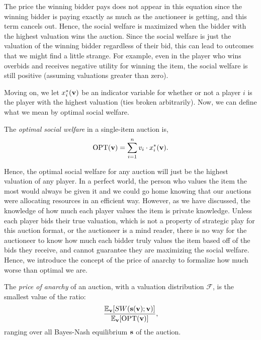 \documentclass[12pt,twoside]{reedthesis}
\begin{document}
The price the winning bidder pays does not appear in this equation since the winning bidder is paying exactly as much as the auctioneer is getting, and this term cancels out. Hence, the social welfare is maximized when the bidder with the highest valuation wins the auction. Since the social welfare is just the valuation of the winning bidder regardless of their bid, this can lead to outcomes that we might find a little strange. For example, even in the player who wins overbids and receives negative utility for winning the item, the social welfare is still positive (assuming valuations greater than zero). 

Moving on, we let $x^*_i(\textbf{v})$ be an indicator variable for whether or not a player $i$ is the player with the highest valuation (ties broken arbitrarily). Now, we can define what we mean by optimal social welfare. 

\begin{dfn}
	The {\em optimal social welfare} in a single-item auction is, 
	$$ \text{OPT}( \textbf{v}) = \sum_{i=1}^{n} v_i \cdot x^*_i (\textbf{v}).$$
\end{dfn}
Hence, the optimal social welfare for any auction will just be the highest valuation of any player. In a perfect world, the person who values the item the most would always be given it and we could go home knowing that our auctions were allocating resources in an efficient way. However, as we have discussed, the knowledge of how much each player values the item is private knowledge. Unless each player bids their true valuation, which is not a property of strategic play for this auction format, or the auctioneer is a mind reader, there is no way for the auctioneer to know how much each bidder truly values the item based off of the bids they receive, and cannot guarantee they are maximizing the social welfare. Hence, we introduce the concept of the price of anarchy to formalize how much worse than optimal we are.
 
\begin{dfn}
	The \textit{price of anarchy} of an auction, with a valuation distribution $\mathcal{F}$, is the smallest value of the ratio:
	\begin{equation}
	\frac{\mathbb{E}_{\textbf{v}} [SW(\textbf{s}(\textbf{v});\textbf{v})]}{\mathbb{E}_{\textbf{v}}[\text{OPT}(\textbf{v})]},
	\end{equation}
	ranging over all Bayes-Nash equilibrium $\textbf{s}$ of the auction.
	\label{dfn:POA}
\end{dfn}
\end{document}
